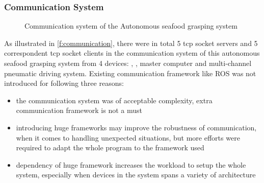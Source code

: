 \subsubsection{Communication System}

\begin{figure}[htb]
    \caption[Communication System of the Autonomous Seafood Grasping
        System]{Communication system of the Autonomous seafood grasping
        system}\label{f:communication}
\end{figure}

As illustrated in \autoref{f:communication}, there were in total 5 \gls{tcp}
socket servers and 5 correspondent \gls{tcp} socket clients in the communication
system of this autonomous seafood grasping system from 4 devices:
, , master computer and multi-channel
pneumatic driving system. Existing communication framework like ROS was not
introduced for following three reasons:

\begin{itemize}
    \item the communication system was of acceptable complexity, extra
          communication framework is not a must
    \item introducing huge frameworks may improve the robustness of
          communication, when it comes to handling unexpected situations, but more
          efforts were required to adapt the whole program to the framework used
    \item dependency of huge framework increases the workload to setup the whole
          system, especially when devices in the system spans a variety of
          architecture
\end{itemize}

